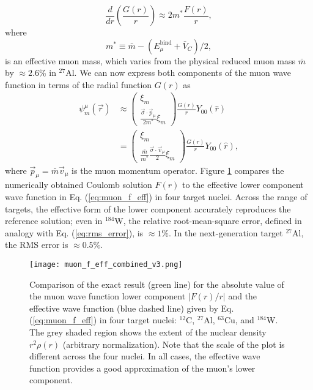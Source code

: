 \documentclass{book}[letterpaper,12pt]
\begin{document}
\begin{equation}
\frac{d}{dr}\left(\frac{G(r)}{r}\right)\approx 2m^*\frac{F(r)}{r},
\end{equation}
where
\begin{equation}
m^*\equiv \bar{m}-\left(E^\mathrm{bind}_{\mu}+\bar{V}_C\right)/2,
\end{equation}
is an effective muon mass, which varies from the physical reduced muon mass $\bar{m}$ by $\approx 2.6$\% in $^{27}$Al. 
We can now express both components of the muon wave function in terms of the radial function $G(r)$ as
\begin{equation}
\begin{split}
\psi^{\mu}_m(\vec{r})&\approx\left(\begin{array}{c}
\xi_m\\
\frac{\vec{\sigma}\cdot\vec{p}_{\mu}}{2m^*}\xi_m
\end{array}\right)\frac{G(r)}{r}Y_{00}(\hat{r})\\
&=\left(\begin{array}{c}
\xi_m\\
\frac{\bar{m}}{m^*}\frac{\vec{\sigma}\cdot\vec{v}_{\mu}}{2}\xi_m
\end{array}\right)\frac{G(r)}{r}Y_{00}(\hat{r}),
\end{split}
\label{eq:muon_f_eff}
\end{equation}
where $\vec{p}_{\mu}=\bar{m}\vec{v}_{\mu}$ is the muon momentum operator. Figure \ref{fig:muon_f_eff} compares the numerically obtained Coulomb solution $F(r)$ to the effective lower component wave function in Eq. (\ref{eq:muon_f_eff}) in four target nuclei. Across the range of targets, the effective form of the lower component accurately reproduces the reference solution; even in $^{184}$W, the relative root-mean-square error, defined in analogy with Eq. (\ref{eq:rms_error}), is $\approx 1\%$. In the next-generation target $^{27}$Al, the RMS error is $\approx 0.5\%$. 

\begin{figure}
\centering
\texttt{[image: muon\_f\_eff\_combined\_v3.png]}
\caption{Comparison of the exact result (green line) for the absolute value of the muon wave function lower component $|F(r)/r|$ and the effective wave function (blue dashed line) given by Eq. (\ref{eq:muon_f_eff}) in four target nuclei: $^{12}$C, $^{27}$Al, $^{63}$Cu, and $^{184}$W. The grey shaded region shows the extent of the nuclear density $r^2\rho(r)$ (arbitrary normalization). Note that the scale of the plot is different across the four nuclei. In all cases, the effective wave function provides a good approximation of the muon's lower component.} 
\label{fig:muon_f_eff}
\end{figure}
\end{document}
